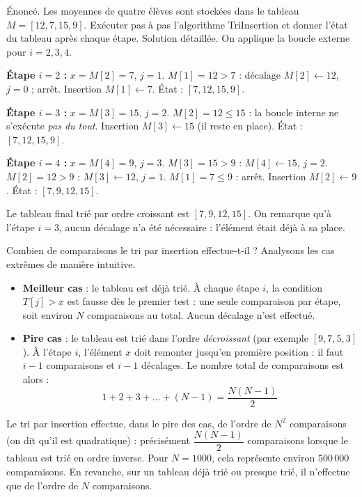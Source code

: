 \documentclass[11pt]{article}
\newcommand{\cle}[1]{{\popxbold\color{popdark}#1}}
\newcounter{popsec}
\newcounter{popsub}
\newcommand{\courssub}[1]{%
  \stepcounter{popsub}%
  \par\vspace{9pt}\noindent{\popxbold\fontsize{11.5}{13}\selectfont\color{popink}{\color{poporange}\thepopsec.\thepopsub}\hspace{6pt}#1}\par\nopagebreak\vspace{4pt}
}
\begin{document}
\begin{exoresolu}
Énoncé. Les moyennes de quatre élèves sont stockées dans le tableau $M = [12, 7, 15, 9]$. Exécuter pas à pas l'algorithme TriInsertion et donner l'état du tableau après chaque étape.
\tcblower
Solution détaillée. On applique la boucle externe pour $i = 2, 3, 4$.

\textbf{Étape $i = 2$ :} $x = M[2] = 7$, $j = 1$. $M[1] = 12 > 7$ : décalage $M[2] \leftarrow 12$, $j = 0$ ; arrêt. Insertion $M[1] \leftarrow 7$. État : $[7, 12, 15, 9]$.

\textbf{Étape $i = 3$ :} $x = M[3] = 15$, $j = 2$. $M[2] = 12 \le 15$ : la boucle interne ne s'exécute \emph{pas du tout}. Insertion $M[3] \leftarrow 15$ (il reste en place). État : $[7, 12, 15, 9]$.

\textbf{Étape $i = 4$ :} $x = M[4] = 9$, $j = 3$. $M[3] = 15 > 9$ : $M[4] \leftarrow 15$, $j = 2$. $M[2] = 12 > 9$ : $M[3] \leftarrow 12$, $j = 1$. $M[1] = 7 \le 9$ : arrêt. Insertion $M[2] \leftarrow 9$. État : $[7, 9, 12, 15]$.

Le tableau final trié par ordre croissant est $[7, 9, 12, 15]$. On remarque qu'à l'étape $i = 3$, aucun décalage n'a été nécessaire : l'élément était déjà à sa place.
\end{exoresolu}

\courssub{Coût de l'algorithme et propriétés}

Combien de comparaisons le tri par insertion effectue-t-il ? Analysons les cas extrêmes de manière intuitive.

\begin{itemize}
\item \textbf{Meilleur cas} : le tableau est déjà trié. À chaque étape $i$, la condition $T[j] > x$ est fausse dès le premier test : une seule comparaison par étape, soit environ $N$ comparaisons au total. Aucun décalage n'est effectué.
\item \textbf{Pire cas} : le tableau est trié dans l'ordre \emph{décroissant} (par exemple $[9, 7, 5, 3]$). À l'étape $i$, l'élément $x$ doit remonter jusqu'en première position : il faut $i-1$ comparaisons et $i-1$ décalages. Le nombre total de comparaisons est alors :
\[ 1 + 2 + 3 + \dots + (N-1) = \frac{N(N-1)}{2} \]
\end{itemize}

\begin{propriete}
Le tri par insertion effectue, dans le pire des cas, de l'ordre de $N^2$ comparaisons (on dit qu'il est \cle{quadratique}) : précisément $\dfrac{N(N-1)}{2}$ comparaisons lorsque le tableau est trié en ordre inverse. Pour $N = 1000$, cela représente environ $500\,000$ comparaisons. En revanche, sur un tableau déjà trié ou presque trié, il n'effectue que de l'ordre de $N$ comparaisons.
\end{propriete}
\end{document}
